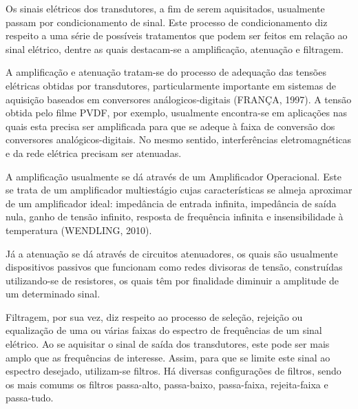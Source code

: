 \documentclass[
	12pt,				
	oneside,			
	a4paper,			
	english,			
	brazil,			
	]{abntex2ppgsi}
\begin{document}
Os sinais elétricos dos transdutores, a fim de serem aquisitados, usualmente passam por condicionamento de sinal. Este processo de condicionamento diz respeito a uma série de possíveis tratamentos que podem ser feitos em relação ao sinal elétrico, dentre as quais destacam-se a amplificação, atenuação e filtragem. 

A amplificação e atenuação tratam-se do processo de adequação das tensões elétricas obtidas por transdutores, particularmente importante em sistemas de aquisição baseados em conversores análogicos-digitais (FRANÇA, 1997). A tensão obtida pelo filme PVDF, por exemplo, usualmente encontra-se em aplicações nas quais esta precisa ser amplificada para que se adeque à faixa de conversão dos conversores analógicos-digitais. No mesmo sentido, interferências eletromagnéticas e da rede elétrica precisam ser atenuadas. 

A amplificação usualmente se dá através de um Amplificador Operacional. Este se trata de um amplificador multiestágio cujas características se almeja aproximar de um amplificador ideal: impedância de entrada infinita, impedância de saída nula, ganho de tensão infinito, resposta de frequência infinita e insensibilidade à temperatura (WENDLING, 2010). 

Já a atenuação se dá através de circuitos atenuadores, os quais são usualmente dispositivos passivos que funcionam como redes divisoras de tensão, construídas utilizando-se de resistores, os quais têm por finalidade diminuir a amplitude de um determinado sinal.


Filtragem, por sua vez, diz respeito ao processo de seleção, rejeição ou equalização de uma ou várias faixas do espectro de frequências de um sinal elétrico. Ao se aquisitar o sinal de saída dos transdutores, este pode ser mais amplo que as frequências de interesse. Assim, para que se limite este sinal ao espectro desejado, utilizam-se filtros. Há diversas configurações de filtros, sendo os mais comums os filtros passa-alto, passa-baixo, passa-faixa, rejeita-faixa e passa-tudo. 


\subsection{}

\end{document}
